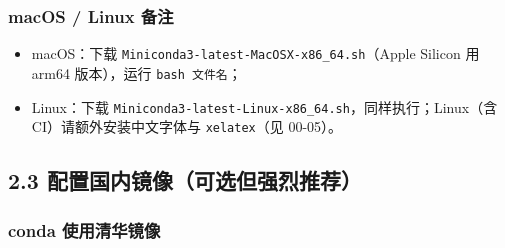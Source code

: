 \begin{Shaded}
\begin{Highlighting}[]
\OperatorTok{{-}{-}}
\OperatorTok{{-}{-}}
\end{Highlighting}
\end{Shaded}

\subsubsection{macOS / Linux 备注}\label{macos-linux-ux5907ux6ce8}

\begin{itemize}
\tightlist
\item
  macOS：下载 \texttt{Miniconda3-latest-MacOSX-x86\_64.sh}（Apple
  Silicon 用 arm64 版本），运行 \texttt{bash\ 文件名}；
\item
  Linux：下载
  \texttt{Miniconda3-latest-Linux-x86\_64.sh}，同样执行；Linux（含
  CI）请额外安装中文字体与 \texttt{xelatex}（见 00-05）。
\end{itemize}

\subsection{2.3
配置国内镜像（可选但强烈推荐）}\label{ux914dux7f6eux56fdux5185ux955cux50cfux53efux9009ux4f46ux5f3aux70c8ux63a8ux8350}

\subsubsection{conda
使用清华镜像}\label{conda-ux4f7fux7528ux6e05ux534eux955cux50cf}

\begin{Shaded}
\begin{Highlighting}[]
\OperatorTok{{-}{-}}\OperatorTok{://}\OperatorTok{/}\OperatorTok{/}\OperatorTok{/}\OperatorTok{/}
\OperatorTok{{-}{-}}\OperatorTok{://}\OperatorTok{/}\OperatorTok{/}\OperatorTok{/}\OperatorTok{/}
\OperatorTok{{-}{-}}
\end{Highlighting}
\end{Shaded}

